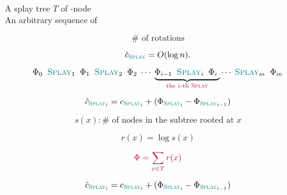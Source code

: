 \begin{frame}{}
  \begin{center}
     \\[30pt] \pause

    A splay tree $T$ of -node \\[6pt]
    An arbitrary sequence of  \splay
  \end{center}

  \pause
  \[
    \# \text{ of rotations}
  \]

  \pause
  \vspace{0.50cm}
  \begin{theorem}
    \[
      \hat{c}_{\textsc{\textcolor{teal}{Splay}}} = O(\log n).
    \]
  \end{theorem}
\end{frame}



\begin{frame}{}
  \[
    \Phi_{0}\;\; \textsc{\textcolor{teal}{Splay}}_{1} \;\;
    \Phi_{1}\;\; \textsc{\textcolor{teal}{Splay}}_{2} \;\;
    \Phi_{2}\;
    \cdots\;
    \underbrace{\Phi_{i-1}\;\; \textsc{\textcolor{teal}{Splay}}_{i}\;\; \Phi_{i}\;}_{\textcolor{purple}{\text{the $i$-th \textsc{Splay}}}}
    \cdots\;
    \textsc{\textcolor{teal}{Splay}}_{m}\;\; 
    \Phi_{m}
  \]

  \vspace{0.30cm}
  \[
    \hat{c}_{\textsc{\textcolor{teal}{Splay}}_{i}} =  c_{\textsc{\textcolor{teal}{Splay}}_{i}} + (\Phi_{\textsc{\textcolor{teal}{Splay}}_{i}} - \Phi_{\textsc{\textcolor{teal}{Splay}}_{i-1}})
  \]

  \pause
\end{frame}

\begin{frame}{}
  \[
    s(x): \# \text{ of nodes in the subtree rooted at } x
  \]

  \pause
  \[
    r(x) = \log s(x)
  \]

  \pause
  \[
    \textcolor{purple}{\Phi = \sum_{x \in T} r(x)}
  \]

  \pause
  \vspace{0.50cm}
  \[
    \hat{c}_{\textsc{\textcolor{teal}{Splay}}_{i}} =  c_{\textsc{\textcolor{teal}{Splay}}_{i}} + (\Phi_{\textsc{\textcolor{teal}{Splay}}_{i}} - \Phi_{\textsc{\textcolor{teal}{Splay}}_{i-1}})
  \]
\end{frame}

